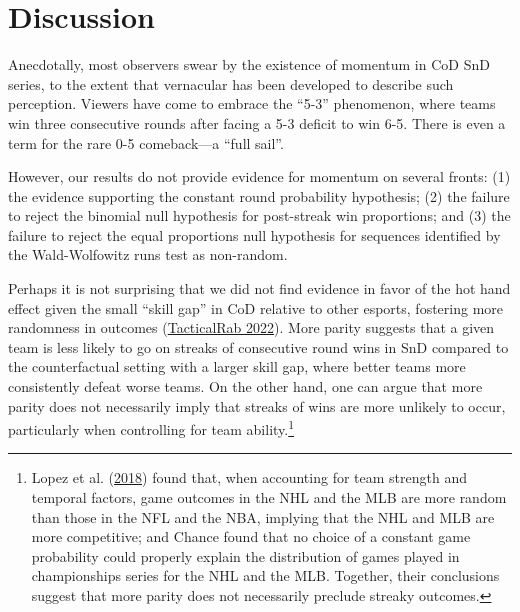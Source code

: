 \documentclass{article}
\begin{document}
\hypertarget{discussion}{%
\section{Discussion}\label{discussion}}

Anecdotally, most observers swear by the existence of momentum in CoD
SnD series, to the extent that vernacular has been developed to describe
such perception. Viewers have come to embrace the ``5-3'' phenomenon,
where teams win three consecutive rounds after facing a 5-3 deficit to
win 6-5. There is even a term for the rare 0-5 comeback---a ``full
sail''.

However, our results do not provide evidence for momentum on several
fronts: (1) the evidence supporting the constant round probability
hypothesis; (2) the failure to reject the binomial null hypothesis for
post-streak win proportions; and (3) the failure to reject the equal
proportions null hypothesis for sequences identified by the
Wald-Wolfowitz runs test as non-random.

Perhaps it is not surprising that we did not find evidence in favor of
the hot hand effect given the small ``skill gap'' in CoD relative to
other esports, fostering more randomness in outcomes
(\protect\hyperlink{ref-tacticalrab2022}{TacticalRab 2022}). More parity
suggests that a given team is less likely to go on streaks of
consecutive round wins in SnD compared to the counterfactual setting
with a larger skill gap, where better teams more consistently defeat
worse teams. On the other hand, one can argue that more parity does not
necessarily imply that streaks of wins are more unlikely to occur,
particularly when controlling for team ability.\footnote{Lopez et al.
  (\protect\hyperlink{ref-lopez2018}{2018}) found that, when accounting
  for team strength and temporal factors, game outcomes in the NHL and
  the MLB are more random than those in the NFL and the NBA, implying
  that the NHL and MLB are more competitive; and Chance found that no
  choice of a constant game probability could properly explain the
  distribution of games played in championships series for the NHL and
  the MLB. Together, their conclusions suggest that more parity does not
  necessarily preclude streaky outcomes.}
\end{document}
